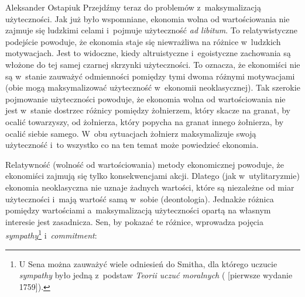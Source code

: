 \begin{artplenv}{Aleksander Ostapiuk}
Przejdźmy teraz do problemów z~maksymalizacją użyteczności. Jak już było wspomniane, ekonomia wolna od wartościowania nie
zajmuje się ludzkimi celami i~pojmuje użyteczność \textit{ad libitum}. To relatywistyczne podejście powoduje, że
ekonomia staje się niewrażliwa na różnice w~ludzkich motywacjach. Jest to widoczne, kiedy altruistyczne i~egoistyczne
zachowania są włożone do tej samej czarnej skrzynki użyteczności. To oznacza, że ekonomiści nie są w~stanie
zauważyć odmienności pomiędzy tymi dwoma różnymi motywacjami (obie mogą maksymalizować użyteczność w~ekonomii
neoklasycznej). Tak szerokie pojmowanie użyteczności powoduje, że ekonomia wolna od wartościowania nie jest w~stanie
dostrzec różnicy pomiędzy żołnierzem, który skacze na granat, by ocalić towarzyszy, od żołnierza, który popycha na
granat innego żołnierza, by ocalić siebie samego. W~obu sytuacjach żołnierz maksymalizuje swoją użyteczność i~to
wszystko co na ten temat może powiedzieć ekonomia. 

Relatywność (wolność od wartościowania) metody ekonomicznej powoduje, że ekonomiści zajmują się tylko konsekwencjami
akcji. Dlatego (jak w~utylitaryzmie) ekonomia neoklasyczna nie uznaje żadnych wartości, które są niezależne od miar
użyteczności i~mają wartość samą w~sobie (deontologia). Jednakże różnica pomiędzy wartościami a~maksymalizacją
użyteczności opartą na własnym interesie jest zasadnicza. Sen, by pokazać te różnice, wprowadza pojęcia
\textit{sympathy}\footnote{U Sena można zauważyć wiele odniesień do Smitha, dla którego uczucie \textit{sympathy} było
jedną z~podstaw \textit{Teorii uczuć moralnych}
(\cite{smith_teoria_1989_ost} [pierwsze wydanie 1759]).
}
i~\textit{commitment}:



\end{artplenv}

